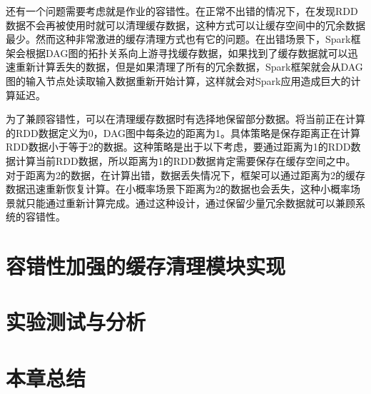 还有一个问题需要考虑就是作业的容错性。在正常不出错的情况下，在发现RDD数据不会再被使用时就可以清理缓存数据，这种方式可以让缓存空间中的冗余数据最少。然而这种非常激进的缓存清理方式也有它的问题。在出错场景下，Spark框架会根据DAG图的拓扑关系向上游寻找缓存数据，如果找到了缓存数据就可以迅速重新计算丢失的数据，但是如果清理了所有的冗余数据，Spark框架就会从DAG图的输入节点处读取输入数据重新开始计算，这样就会对Spark应用造成巨大的计算延迟。

为了兼顾容错性，可以在清理缓存数据时有选择地保留部分数据。将当前正在计算的RDD数据定义为0，DAG图中每条边的距离为1。具体策略是保存距离正在计算RDD数据小于等于2的数据。这种策略是出于以下考虑，要通过距离为1的RDD数据计算当前RDD数据，所以距离为1的RDD数据肯定需要保存在缓存空间之中。对于距离为2的数据，在计算出错，数据丢失情况下，框架可以通过距离为2的缓存数据迅速重新恢复计算。在小概率场景下距离为2的数据也会丢失，这种小概率场景就只能通过重新计算完成。通过这种设计，通过保留少量冗余数据就可以兼顾系统的容错性。

\section{容错性加强的缓存清理模块实现}



\section{实验测试与分析}
\section{本章总结}
